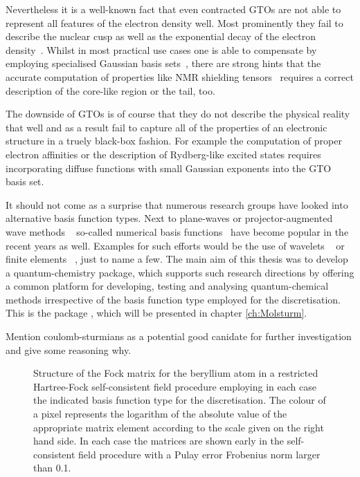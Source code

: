 Nevertheless it is a well-known fact
that even contracted GTOs are not able to represent
all features of the electron density well.
Most prominently they fail to describe the nuclear cusp as well as
the exponential decay of the electron density~\cite{Kato1957}.
Whilst in most practical use cases one is able to compensate
by employing specialised Gaussian basis sets~\cite{Jensen2013,Hill2013},
there are strong hints that the accurate computation of properties
like NMR shielding tensors~\cite{Guell2008,Hoggan2009}
requires a correct description of the core-like region or the tail, too.

The downside of GTOs is of course that they do not describe the physical
reality that well and as a result fail to capture all of the properties
of an electronic structure in a truely black-box fashion.
For example the computation of proper electron affinities or the description
of Rydberg-like excited states requires incorporating diffuse functions
with small Gaussian exponents into the GTO basis set.

It should not come as a surprise that numerous research groups
have looked into alternative basis function types.
Next to plane-waves or projector-augmented wave methods%
~\cite{Kresse1996,Kresse1999,Mortensen2005,Enkovaara2010}
so-called numerical basis functions~\cite{Frediani2015}
have become popular in the recent years as well.
Examples for such efforts would be the use of wavelets%
~\cite{Bischoff2011,Bischoff2012,Bischoff2013,Bischoff2014,Bischoff2014a,Bischoff2017}
or finite elements%
~\cite{Tsuchida1995,Soler2002,Lehtovaara2009,Alizadegan2010,Avery2011PhD,Davydov2015,Boffi2016},
just to name a few.
The main aim of this thesis was to develop a quantum-chemistry
package, which supports such research directions
by offering a common platform for developing, testing and analysing
quantum-chemical methods irrespective of the basis function type employed for
the discretisation.
This is the package \molsturm,
which will be presented in chapter \vref{ch:Molsturm}.

Mention coulomb-sturmians as a potential good canidate for further
investigation and give some reasoning why.


\begin{figure}
	\centering
	\caption{
		Structure of the Fock matrix for the beryllium atom
		in a restricted Hartree-Fock self-consistent field procedure
		employing in each case the indicated basis function type
		for the discretisation.
		The colour of a pixel represents the logarithm
		of the absolute value of the appropriate matrix element
		according to the scale given on the right hand side.
		In each case the matrices are shown early in the self-consistent
		field procedure with a Pulay error Frobenius norm larger than 0.1.
	}
	\label{fig:FockStructure}
\end{figure}

